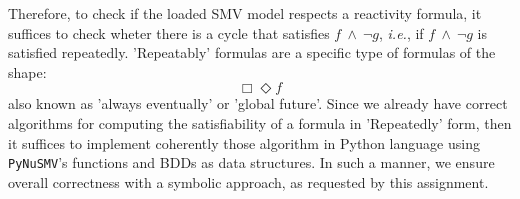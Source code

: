 
Therefore, to check if the loaded SMV model respects a reactivity formula, it suffices to check wheter there is a cycle that satisfies $f\ \wedge\ \neg g$, \emph{i.e.}, if $f\ \wedge\ \neg g$ is satisfied repeatedly. 'Repeatably' formulas are a specific type of formulas of the shape:
    \[ \Box\Diamond f \]
also known as 'always eventually' or 'global future'. Since we already have correct algorithms for computing the satisfiability of a formula in 'Repeatedly' form, then it suffices to implement coherently those algorithm in Python language using \texttt{PyNuSMV}'s functions and BDDs as data structures. In such a manner, we ensure overall correctness with a symbolic approach, as requested by this assignment.\newline


